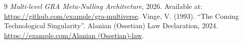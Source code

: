 \documentclass[12pt,a4paper]{article}
\theoremstyle{definition}
\begin{document}
\begin{thebibliography}{9}
 \emph{Multi‑level GRA Meta‑Nulling Architecture}, 2026. Available at: \url{https://github.com/example/gra-multiverse}.
 Vinge, V. (1993). ``The Coming Technological Singularity''.
 Alanian  (Ossetian) Law Declaration, 2024. \url{https://example.com/Alanian  (Ossetian)-law}.
\end{thebibliography}
\end{document}
